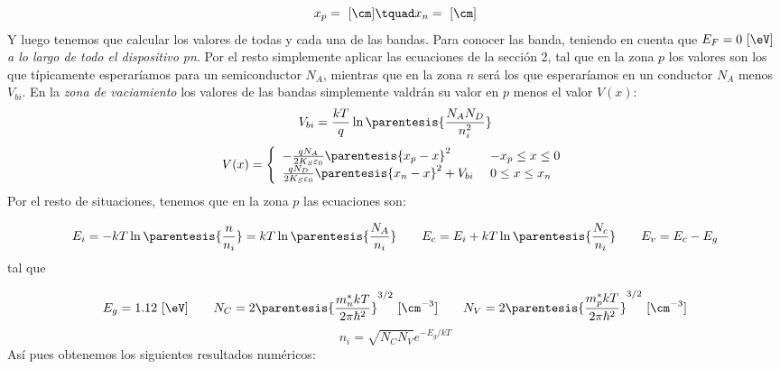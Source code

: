 \begin{enumerate}[label=\alph*)]
        \begin{equation}
            x_p =  \ [\cm] \tquad x_n = \ [\cm]
        \end{equation}
        Y luego tenemos que calcular los valores de todas y cada una de las bandas. Para conocer las banda, teniendo en cuenta que $E_F=0 \ [\eV]$  \textit{a lo largo de todo el dispositivo pn}. Por el resto simplemente aplicar las ecuaciones de la sección 2, tal que en la zona $p$ los valores son los que típicamente esperaríamos para un semiconductor $N_A$, mientras que en la zona $n$ será los que esperaríamos en un conductor $N_A$ menos $V_{bi}$. En la \textit{zona de vaciamiento} los valores de las bandas simplemente valdrán su valor en $p$ menos el valor $V(x)$:
        \begin{equation*}
            V_{bi} = \frac{kT}{q} \ln \parentesis{\frac{N_AN_D}{n_i^2}}
        \end{equation*}
        \begin{equation*}
            V(x) = \left\lbrace \begin{array}{ll}
                - \frac{qN_A}{2K_S\varepsilon_0} \parentesis{x_p - x}^2  & \ - x_p \leq x \leq 0 \\
                \frac{qN_D}{2K_S\varepsilon_0} \parentesis{x_n - x}^2 + V_{bi}  & \ 0 \leq x \leq x_n \\
            \end{array} \right.
        \end{equation*}
        Por el resto de situaciones, tenemos que en la zona $p$ las ecuaciones son:

        \begin{equation*}
            E_i = - kT \ln \parentesis{\frac{n}{n_i}} = kT \ln \parentesis{\frac{N_A}{n_i}} \qquad E_c  = E_i  + kT \ln \parentesis{\frac{N_c}{n_i} } \qquad E_v  =E_c-E_g
        \end{equation*}
        tal que

        \begin{equation*}
            E_g = 1.12 \ [\eV] \qquad N_C = 2 \parentesis{\frac{m_n^* kT}{2\pi \hbar^2}}^{3/2}  \ [\cm^{-3}] \qquad  N_V = 2 \parentesis{\frac{m_p^* kT}{2\pi \hbar^2}}^{3/2} \ [\cm^{-3}]
        \end{equation*}
        \begin{equation*}
            n_i = \sqrt{N_CN_V} e^{-E_g/kT}
        \end{equation*}
        Así pues obtenemos los siguientes resultados numéricos:
    \end{enumerate}
